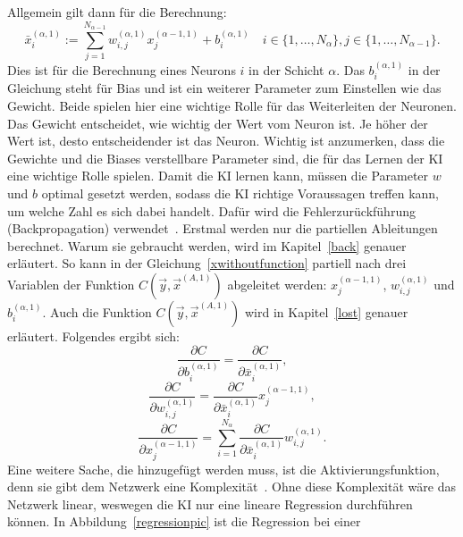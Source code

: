 \documentclass[11pt]{article}
\begin{document}
Allgemein gilt dann für die Berechnung:
\begin{equation}
    \label{xwithoutfunction}
    \bar{x}_{i}^{(\alpha,1)} := \sum_{j=1}^{N_{\alpha-1}} w_{i,j}^{(\alpha,1)} x_{j}^{(\alpha-1,1)} + b_{i}^{(\alpha,1)} \quad i \in \{1,\ldots,N_{\alpha}\}, j \in \{1,\ldots,N_{\alpha-1}\}.
\end{equation}
Dies ist für die Berechnung eines Neurons $i$ in der Schicht $\alpha$.
Das $ b_{i}^{(\alpha,1)} $ in der Gleichung steht für Bias und ist ein weiterer Parameter zum Einstellen wie das Gewicht. Beide spielen hier eine wichtige Rolle
für das Weiterleiten der Neuronen. Das Gewicht entscheidet, wie wichtig der Wert vom Neuron ist. Je höher der Wert ist, desto entscheidender
ist das Neuron. Wichtig ist anzumerken, dass die Gewichte und die Biases verstellbare Parameter sind, die für das Lernen der KI eine wichtige Rolle
spielen. Damit die KI lernen kann, müssen die Parameter $w$ und $b$ optimal gesetzt werden, sodass die KI richtige Voraussagen treffen kann, um welche Zahl es sich dabei handelt.
Dafür wird die Fehlerzurückführung (Backpropagation) verwendet~\cite{5}. Erstmal werden nur die partiellen Ableitungen berechnet. Warum sie gebraucht werden, wird im Kapitel~\ref{back} genauer
erläutert. So kann in der Gleichung~\ref{xwithoutfunction} partiell nach drei Variablen der Funktion $C(\vec{y},\vec{x}^{(A,1)})$ abgeleitet werden: $x_{j}^{(\alpha-1,1)}$, $w_{i,j}^{(\alpha,1)}$ und $b_{i}^{(\alpha,1)}$.
Auch die Funktion $C(\vec{y},\vec{x}^{(A,1)})$ wird in Kapitel~\ref{lost} genauer erläutert.
Folgendes ergibt sich:
\begin{equation}
    \frac{\partial C}{\partial b_i^{(\alpha,1)}} = \frac{\partial C}{\partial \bar{x}_i^{(\alpha,1)}},
\end{equation}
\begin{equation}
    \frac{\partial C}{\partial w_{i,j}^{(\alpha,1)}} = \frac{\partial C}{\partial \bar{x}_i^{(\alpha,1)}} x_j^{(\alpha-1,1)},
    \label{w}
\end{equation}
\begin{equation}
    \frac{\partial C}{\partial x_{j}^{(\alpha-1,1)}} = \sum_{i=1}^{N_{\alpha}} \frac{\partial C}{\partial \bar{x}_i^{(\alpha,1)}} w_{i,j}^{(\alpha,1)}.
\end{equation}
Eine weitere Sache, die hinzugefügt werden muss, ist die Aktivierungsfunktion, denn sie gibt dem Netzwerk eine Komplexität~\cite{7}.
Ohne diese Komplexität wäre das Netzwerk linear, weswegen die KI nur eine lineare Regression durchführen können.
In Abbildung~\ref{regressionpic} ist die Regression bei einer
\end{document}
